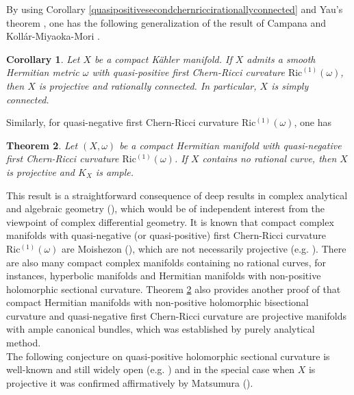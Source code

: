 \documentclass[11pt]{amsart}
\theoremstyle{plain}
\newtheorem{thm}{Theorem}[section]
\newtheorem{cor}[thm]{Corollary}
\theoremstyle{definition}
\newcommand{\btheorem}{\begin{thm}}
\newcommand{\etheorem}{\end{thm}}
\newcommand{\bcorollary}{\begin{cor}}
\newcommand{\ecorollary}{\end{cor}}
\renewcommand{\>}{\rightarrow}
\numberwithin{equation}{section} %
\begin{document}
\noindent	By using  Corollary \ref{quasipositivesecondchernriccirationallyconnected}  and Yau's theorem \cite{Yau1978}, one has the following generalization of the result of  Campana \cite{Campana1992} and Koll\'ar-Miyaoka-Mori \cite{KollarMiyaokaMori1992}.
	
		\bcorollary \label{weakfano} Let $X$ be a compact K\"ahler manifold. If $X$
	admits a smooth Hermitian metric $\omega$ with quasi-positive first Chern-Ricci curvature $\mathrm{Ric}^{(1)}(\omega)$, then $X$ is projective and rationally connected. In particular, $X$ is simply connected.
	\ecorollary
	
	
	
	
	  \noindent Similarly,	for quasi-negative first Chern-Ricci curvature $\mathrm{Ric^{(1)}}(\omega)$, one has
	
	
	\btheorem \label{quasinegative} Let $(X,\omega)$ be a compact Hermitian manifold with quasi-negative first Chern-Ricci curvature $\mathrm{Ric^{(1)}}(\omega)$.
	If $X$ contains no rational curve, then $X$ is  projective  and $K_X$ is ample.
	\etheorem
	
		\noindent  This result is a straightforward consequence of deep results in complex analytical and algebraic geometry (\cite{Mori1982,Siu1984,Demailly1985,Kawamata1985,Birkar2010,Cascini2013}), which would be of independent interest from the viewpoint of complex differential geometry. It is known that  compact complex manifolds with quasi-negative (or quasi-positive) first Chern-Ricci curvature
	$\mathrm{Ric^{(1)}}(\omega)$ are Moishezon (\cite{Siu1984,Demailly1985}), which are not necessarily projective (e.g. \cite{Ma2007}).
	There are also many compact complex manifolds containing no rational curves, for instances,
	hyperbolic manifolds and Hermitian manifolds with non-positive holomorphic sectional curvature. Theorem \ref{quasinegative} also provides another proof of \cite[Corollary~1.1]{Lee2018} that  compact Hermitian manifolds with non-positive holomorphic bisectional curvature and quasi-negative first Chern-Ricci curvature are projective manifolds with ample canonical bundles,  which was established by purely analytical method.\\
	
	
	
	\noindent 
	The following conjecture on quasi-positive holomorphic sectional curvature is well-known and still widely open (e.g. \cite[Conjecture~1.9]{Yang2018b}) and in the special case when $X$ is projective it was confirmed affirmatively by Matsumura  (\cite{Matsumura2018b}). 
	
\end{document}
